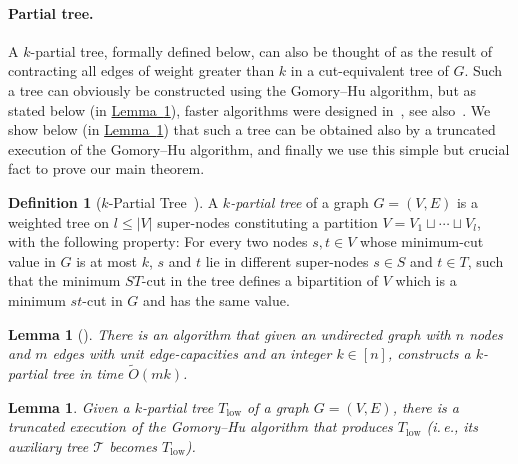 \documentclass[11pt]{article}
\numberwithin{equation}{section}
\newtheorem{lemma}[theorem]{Lemma}
\theoremstyle{definition}
\newtheorem{definition}[theorem]{Definition}
\theoremstyle{plain}
\newcommand{\ie}{i.\,e.}
\newcommand{\expref}[2]{\hyperref[#2]{#1~\ref{#2}}}
\theoremstyle{plain}
\newcommand\tO{\ensuremath{\widetilde O}}  %
\newcommand{\T}{\mathcal{T}}
\providecommand{\card}[1]{\lvert#1\rvert}
\begin{document}
\paragraph{Partial tree.}
A $k$-partial tree, formally defined below, can also be thought of as
the result of contracting all edges of weight greater than $k$
in a cut-equivalent tree of $G$.
Such a tree can obviously be constructed using the Gomory--Hu algorithm,
but as stated below (in \expref{Lemma}{Lemma:Partial}),
faster algorithms were designed in~\cite{HKP07,BHKP07},
see also~\cite[Theorem $3$]{Panigrahi16}.
We show below (in \expref{Lemma}{lem:truncatedGH}) that such a tree
can be obtained also by a truncated execution of the Gomory--Hu algorithm,
and finally we use this simple but crucial fact to prove our main theorem.


\begin{definition}[$k$-Partial Tree~\cite{HKP07}]
  A \emph{$k$-partial tree} of a graph $G=(V,E)$ is a weighted tree on $l\leq \card{V}$ super-nodes constituting a partition $V=V_1 \sqcup\cdots\sqcup V_l$, with the following property:
  For every two nodes $s,t\in V$ whose minimum-cut value in $G$ is at most $k$, $s$ and $t$ lie in different super-nodes $s\in S$ and $t\in T$, such that the minimum $ST$-cut in the tree defines a bipartition of $V$
  which is a minimum $st$-cut in $G$ and has the same value.
\end{definition}

\begin{lemma}[\cite{BHKP07}]
\label{Lemma:Partial}
There is an algorithm that given an undirected graph with $n$ nodes and $m$ edges with unit edge-capacities and an integer $k\in [n]$, constructs a $k$-partial tree in time $\tO(mk)$.
\end{lemma}

\begin{lemma} \label{lem:truncatedGH}
  Given a $k$-partial tree $T_{\mathrm{low}}$ of a graph $G=(V,E)$, there is a truncated execution of the Gomory--Hu algorithm that produces $T_{\mathrm{low}}$ (\ie, its auxiliary tree $\T$ becomes $T_{\mathrm{low}}$).
\end{lemma}
\end{document}

